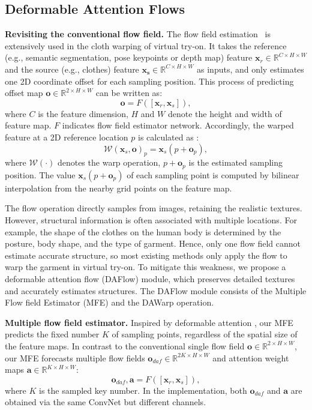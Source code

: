 \documentclass[runningheads]{llncs}
\begin{document}
\subsection{Deformable Attention Flows\label{sec:daf}}

\textbf{Revisiting the conventional flow field.} 
The flow field estimation~\cite{han2019clothflow,zflow,ge2021parser} is extensively used in the cloth warping of virtual try-on.  It takes the reference (e.g., semantic segmentation, pose keypoints or depth map) feature $\bm{x}_r \in \mathbb{R}^{C\times H\times W}$ and the source (e.g., clothes) feature $\bm{x_s} \in \mathbb{R}^{C\times H\times W}$ as inputs, and only estimates one 2D coordinate offset for each sampling position. This process of predicting offset map $\bm{o} \in \mathbb{R}^{2\times H\times W}$ can be written as:
\begin{equation}
\bm{o} = F([\bm{x}_r,\bm{x}_s]), 
\end{equation}
where $C$ is the feature dimension, $H$ and $W$ denote the height and width of  feature map.  $F$ indicates flow field estimator network. Accordingly, the warped feature at a 2D reference location $p$ is calculated as :
\begin{equation}
\mathcal{W}(\bm{x}_s,\bm{o})_p = \bm{x}_s(p+ \bm{o}_p),
\end{equation}
where $\mathcal{W}(\cdot)$ denotes the warp operation, $p + \bm{o}_p$ is the estimated sampling position. The value $\bm{x}_s(p+\bm{o}_p)$ of each sampling point
is computed by bilinear interpolation from the nearby grid
points on the feature map. 

The flow operation directly samples from images, retaining the realistic textures. However, structural information is often associated with multiple locations. For example, the shape of the clothes on the human body is determined by the posture, body shape, and the type of garment. Hence, only one flow field cannot estimate accurate structure, so most existing methods only apply the flow to warp the garment in virtual try-on. To mitigate this weakness, we propose a deformable attention flow (DAFlow) module, which preserves detailed textures and accurately estimates structures. The DAFlow module consists of the Multiple Flow field Estimator (MFE) and the DAWarp operation.

\textbf{Multiple flow field estimator.} Inspired by deformable attention \cite{zhu2020deformable}, our MFE predicts the fixed number $K$ of sampling points, regardless of the spatial size of the feature maps. In contrast to the conventional single flow field $\bm{o} \in \mathbb{R}^{2\times H\times W}$, our MFE forecasts multiple flow fields  $\bm{o}_{daf} \in \mathbb{R}^{2K\times H\times W}$ and attention weight maps $\bm{a} \in \mathbb{R}^{K\times H\times W}$:
\begin{equation}
\bm{o}_{daf}, \bm{a} = F([\bm{x}_r,\bm{x}_s]), 
\end{equation}
where $K$ is the sampled key number. In the implementation, both $\bm{o}_{daf} $ and $\bm{a}$ are obtained via the same ConvNet but different channels.
\end{document}
